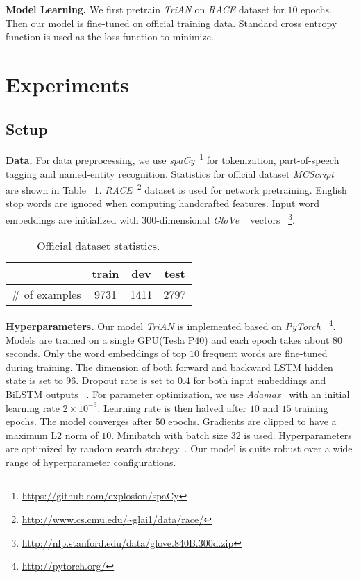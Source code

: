 \documentclass[11pt,a4paper]{article}
\begin{document}
\noindent
\textbf{Model Learning. }
We first pretrain \emph{TriAN} on \emph{RACE} dataset for $10$ epochs.
Then our model is fine-tuned on official training data.
Standard cross entropy function is used as the loss function to minimize.

\section{Experiments}
\subsection{Setup}
\noindent
\textbf{Data. }
For data preprocessing,
we use \emph{spaCy}~\footnote{\url{https://github.com/explosion/spaCy}}
for tokenization, part-of-speech tagging and named-entity recognition.
Statistics for official dataset \emph{MCScript} ~\cite{MCScript} are shown in Table ~\ref{table:dataset}.
\emph{RACE}~\footnote{\url{http://www.cs.cmu.edu/~glai1/data/race/}}
dataset is used for network pretraining.
English stop words are ignored when computing handcrafted features.
Input word embeddings are initialized with $300$-dimensional
\emph{GloVe} ~\cite{pennington2014glove} vectors ~\footnote{\url{http://nlp.stanford.edu/data/glove.840B.300d.zip}}.

\begin{table}[ht]
\centering
\begin{tabular}{c|ccc}
 \hline
               & train & dev  & test \\ \hline
\# of examples & 9731  & 1411 & 2797 \\ \hline
\end{tabular}
\caption{Official dataset statistics.}
\label{table:dataset}
\end{table}

\noindent
\textbf{Hyperparameters. }
Our model \emph{TriAN} is implemented based on \emph{PyTorch} ~\footnote{\url{http://pytorch.org/}}.
Models are trained on a single GPU(Tesla P40)
and each epoch takes about $80$ seconds.
Only the word embeddings of top $10$ frequent words are fine-tuned during training.
The dimension of both forward and backward LSTM hidden state is set to $96$.
Dropout rate is set to $0.4$ for both input embeddings and BiLSTM outputs ~\cite{srivastava2014dropout}.
For parameter optimization,
we use \emph{Adamax}~\cite{kingma2014adam} with an initial learning rate $2\times10^{-3}$.
Learning rate is then halved after $10$ and $15$ training epochs.
The model converges after $50$ epochs.
Gradients are clipped to have a maximum L2 norm of $10$.
Minibatch with batch size $32$ is used.
Hyperparameters are optimized by random search strategy~\cite{bergstra2012random}.
Our model is quite robust over a wide range of hyperparameter configurations.
\end{document}

